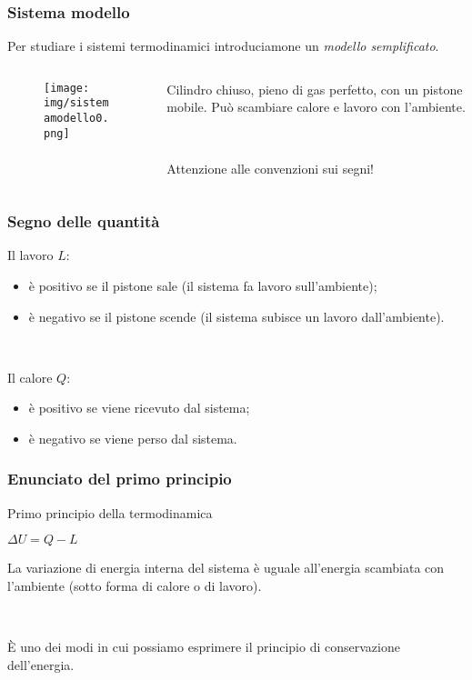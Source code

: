 \documentclass[]{beamer}
\theoremstyle{plain}
\begin{document}
\begin{frame}
\frametitle{Sistema modello}
Per studiare i sistemi termodinamici introduciamone un \emph{modello semplificato}.

\begin{columns}
\begin{column}{0.5\textwidth}
\begin{figure}
\texttt{[image: img/sistemamodello0.png]}
\end{figure}
\end{column}
\begin{column}{0.4\textwidth}
Cilindro chiuso, pieno di gas perfetto, con un pistone mobile. \alert<1>{Può scambiare calore e lavoro con l'ambiente}.\pause

~

\alert<2>{Attenzione alle convenzioni sui segni!}
\end{column}
\end{columns}
\end{frame}

\begin{frame}
\frametitle{Segno delle quantità}
Il lavoro $ L $:
\begin{itemize}
  \item è positivo se il pistone sale (il sistema fa lavoro sull'ambiente);\pause
  \item è negativo se il pistone scende (il sistema subisce un lavoro dall'ambiente).\pause
\end{itemize}

~

Il calore $ Q $:
\begin{itemize}
  \item è positivo se viene ricevuto dal sistema;\pause
  \item è negativo se viene perso dal sistema.
\end{itemize}
\end{frame}


\begin{frame}
\frametitle{Enunciato del primo principio}
\begin{block}{Primo principio della termodinamica}
\begin{center}
\colorbox{blue!30}{$ \Delta U = Q - L $}
\end{center}
La variazione di energia interna del sistema è uguale all'energia scambiata con l'ambiente (sotto forma di calore o di lavoro).
\end{block}\pause

~

È uno dei modi in cui possiamo esprimere il \alert{principio di conservazione dell'energia}.
\end{frame}
\end{document}
